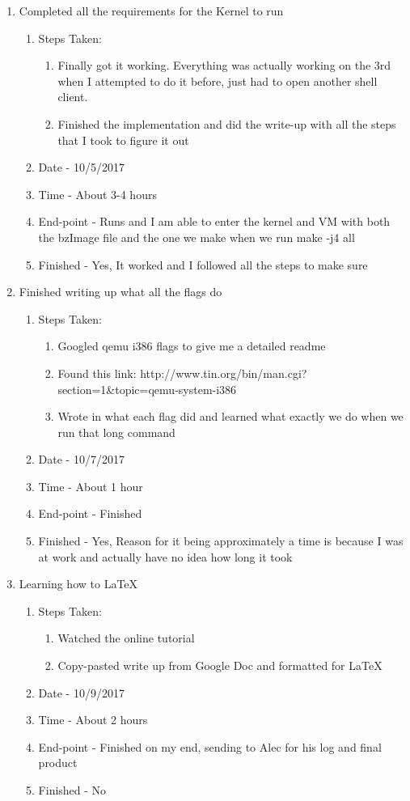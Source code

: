 \documentclass[letterpaper,10pt,fleqn]{article}
\begin{document}
\begin{enumerate}
	\item Completed all the requirements for the Kernel to run
		\begin{enumerate}
			\item Steps Taken:
				\begin{enumerate}
					\item Finally got it working. Everything was actually working on the 3rd when I attempted to do it before, just had to open another shell client.
					\item Finished the implementation and did the write-up with all the steps that I took to figure it out
				\end{enumerate}
			\item Date - 10/5/2017
			\item Time - About 3-4 hours
			\item End-point - Runs and I am able to enter the kernel and VM with both the bzImage file and the one we make when we run make -j4 all
			\item Finished - Yes, It worked and I followed all the steps to make sure
		\end {enumerate}		
			
	\item Finished writing up what all the flags do
		\begin{enumerate}
			\item Steps Taken:
				\begin{enumerate}
					\item Googled qemu i386 flags to give me a detailed readme
					\item Found this link: http://www.tin.org/bin/man.cgi?section=1\&topic=qemu-system-i386
					\item Wrote in what each flag did and learned what exactly we do when we run that long command
				\end{enumerate}
			\item Date - 10/7/2017
			\item Time - About 1 hour
			\item End-point - Finished
			\item Finished -  Yes, Reason for it being approximately a time is because I was at work and actually have no idea how long it took
		\end {enumerate}		
			
	\item Learning how to LaTeX
		\begin{enumerate}
			\item Steps Taken:
				\begin{enumerate}
					\item Watched the online tutorial
					\item Copy-pasted write up from Google Doc and formatted for LaTeX
				\end{enumerate}
			\item Date - 10/9/2017
			\item Time - About 2 hours
			\item End-point - Finished on my end, sending to Alec for his log and final product
			\item Finished -  No
		\end {enumerate}		
		

\end{enumerate}
\end{document}
